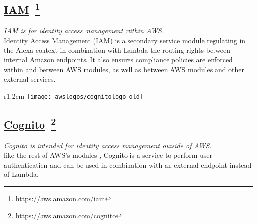 \subsection*{
\href{https://aws.amazon.com/iam/}{\textbf{IAM}}~\footnote{\url{https://aws.amazon.com/iam}}
}
	\textit{IAM is for identity access management within AWS.}\\
	Identity Access Management (IAM) is a secondary service module regulating in the Alexa context in combination with Lambda the routing rights between internal Amazon endpoints. It also ensures compliance policies are enforced within and between AWS modules, as well as between AWS modules and other external services.
%	



\begin{wrapfigure}[2]{r}{1.2cm}
	\texttt{[image: awslogos/cognitologo\_old]}
\end{wrapfigure}


\subsection*{
\href{https://aws.amazon.com/cognito/}{\textbf{Cognito}}~\footnote{\url{https://aws.amazon.com/cognito}}
}
	\textit{Cognito is intended for identity access management outside of AWS.}\\
	like the rest of AWS's modules%
	, Cognito is a %
	service 
	to perform user authentication and can be used in combination with an external endpoint instead of Lambda.\\
	


	


